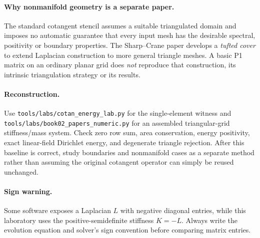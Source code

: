\paragraph{Why nonmanifold geometry is a separate paper.}
The standard cotangent stencil assumes a suitable triangulated
domain and imposes no automatic guarantee that every input
mesh has the desirable spectral, positivity or boundary properties.
The Sharp--Crane paper develops a \emph{tufted cover} to extend
Laplacian construction to more general triangle meshes. A basic
P1 matrix on an ordinary planar grid does \emph{not} reproduce that
construction, its intrinsic triangulation strategy or its results.

\paragraph{Reconstruction.}
Use \texttt{tools/labs/cotan\_energy\_lab.py} for the single-element
witness and \texttt{tools/labs/book02\_papers\_numeric.py} for an
assembled triangular-grid stiffness/mass system. Check zero
row sum, area conservation, energy positivity, exact linear-field
Dirichlet energy, and degenerate triangle rejection.
After this baseline is correct, study boundaries and nonmanifold
cases as a separate method rather than assuming the original
cotangent operator can simply be reused unchanged.

\paragraph{Sign warning.}
Some software exposes a Laplacian \(L\) with negative diagonal
entries, while this laboratory uses the positive-semidefinite
stiffness \(K=-L\). Always write the evolution equation and
solver's sign convention before comparing matrix entries.
